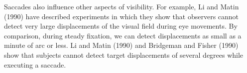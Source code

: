 Saccades also influence other aspects of visibility.  For example, Li
and Matin (1990) have described experiments in which they show that
observers cannot detect very large displacements of the visual field
during eye movements.  By comparison, during steady fixation, we can
detect displacements as small as a minute of arc or less.  Li and
Matin (1990) and Bridgeman and Fisher (1990) show that subjects cannot
detect target displacements of several degrees while executing a
saccade.

